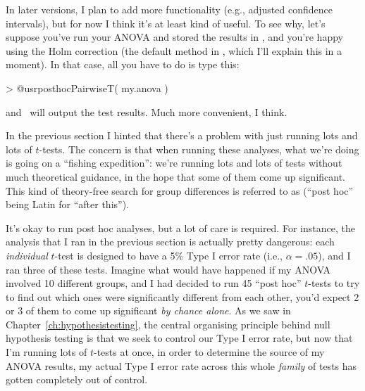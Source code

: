 In later versions, I plan to add more functionality (e.g., adjusted  confidence intervals), but for now I think it's at least kind of useful. To see why, let's suppose you've run your ANOVA and stored the results in , and you're happy using the Holm correction (the default method in , which I'll explain this in a moment). In that case, all you have to do is type this:
\begin{rblock1}
> @usr{posthocPairwiseT( my.anova )}
\end{rblock1}
and \R\ will output the test results. Much more convenient, I think.





In the previous section I hinted that there's a problem with just running lots and lots of $t$-tests. The concern is that when running these analyses, what we're doing is going on a ``fishing expedition'': we're running lots and lots of tests without much theoretical guidance, in the hope that some of them come up significant. This kind of theory-free search for group differences is referred to as  (``post hoc'' being Latin for ``after this'').   

It's okay to run post hoc analyses, but a lot of care is required. For instance, the analysis that I ran in the previous section is actually pretty dangerous: each {\it individual} $t$-test is designed to have a 5\% Type I error rate (i.e., $\alpha = .05$), and I ran three of these tests. Imagine what would have happened if my ANOVA involved 10 different groups, and I had decided to run 45 ``post hoc'' $t$-tests to try to find out which ones were significantly different from each other, you'd expect 2 or 3 of them to come up significant {\it by chance alone}. As we saw in Chapter~\ref{ch:hypothesistesting}, the central organising principle behind null hypothesis testing is that we seek to control our Type I error rate, but now that I'm running lots of $t$-tests at once, in order to determine the source of my ANOVA results, my actual Type I error rate across this whole {\it family} of tests has gotten completely out of control. 

